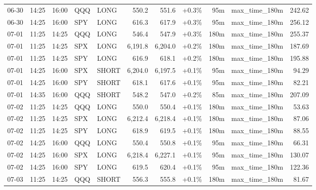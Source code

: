 \documentclass[11pt,a4paper,twoside]{article}
\begin{document}
\begin{center}
\begin{longtable}{>{\color{txtmain}}l l l l l r r r r >{\color{txtmain}}l r}
06-30 & 14:25 & 16:00 & QQQ & LONG & 550.2 & 551.6 & \textcolor{wingreen}{+0.3\%} & 95m & max\_time\_180m & \textcolor{wingreen}{242.62} \\
06-30 & 14:25 & 16:00 & SPY & LONG & 616.3 & 617.9 & \textcolor{wingreen}{+0.3\%} & 95m & max\_time\_180m & \textcolor{wingreen}{256.12} \\
07-01 & 11:25 & 14:25 & QQQ & LONG & 546.4 & 547.9 & \textcolor{wingreen}{+0.3\%} & 180m & max\_time\_180m & \textcolor{wingreen}{255.37} \\
07-01 & 11:25 & 14:25 & SPX & LONG & 6,191.8 & 6,204.0 & \textcolor{wingreen}{+0.2\%} & 180m & max\_time\_180m & \textcolor{wingreen}{187.69} \\
07-01 & 11:25 & 14:25 & SPY & LONG & 616.9 & 618.1 & \textcolor{wingreen}{+0.2\%} & 180m & max\_time\_180m & \textcolor{wingreen}{195.88} \\
07-01 & 14:25 & 16:00 & SPX & SHORT & 6,204.0 & 6,197.5 & \textcolor{wingreen}{+0.1\%} & 95m & max\_time\_180m & \textcolor{wingreen}{94.29} \\
07-01 & 14:25 & 16:00 & SPY & SHORT & 618.1 & 617.6 & \textcolor{wingreen}{+0.1\%} & 95m & max\_time\_180m & \textcolor{wingreen}{82.21} \\
07-01 & 14:35 & 16:00 & QQQ & SHORT & 548.2 & 547.0 & \textcolor{wingreen}{+0.2\%} & 85m & max\_time\_180m & \textcolor{wingreen}{207.09} \\
07-02 & 11:25 & 14:25 & QQQ & LONG & 550.0 & 550.4 & \textcolor{wingreen}{+0.1\%} & 180m & max\_time\_180m & \textcolor{wingreen}{53.63} \\
07-02 & 11:25 & 14:25 & SPX & LONG & 6,212.4 & 6,218.4 & \textcolor{wingreen}{+0.1\%} & 180m & max\_time\_180m & \textcolor{wingreen}{87.06} \\
07-02 & 11:25 & 14:25 & SPY & LONG & 618.9 & 619.5 & \textcolor{wingreen}{+0.1\%} & 180m & max\_time\_180m & \textcolor{wingreen}{88.55} \\
07-02 & 14:25 & 16:00 & QQQ & LONG & 550.4 & 550.8 & \textcolor{wingreen}{+0.1\%} & 95m & max\_time\_180m & \textcolor{wingreen}{66.31} \\
07-02 & 14:25 & 16:00 & SPX & LONG & 6,218.4 & 6,227.1 & \textcolor{wingreen}{+0.1\%} & 95m & max\_time\_180m & \textcolor{wingreen}{130.07} \\
07-02 & 14:25 & 16:00 & SPY & LONG & 619.5 & 620.4 & \textcolor{wingreen}{+0.1\%} & 95m & max\_time\_180m & \textcolor{wingreen}{122.36} \\
07-03 & 11:25 & 14:25 & QQQ & SHORT & 556.3 & 555.8 & \textcolor{wingreen}{+0.1\%} & 180m & max\_time\_180m & \textcolor{wingreen}{81.67} \\

\end{longtable}
\end{center}
\end{document}
